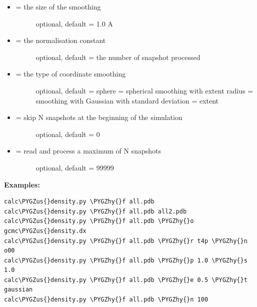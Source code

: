 \documentclass[letterpaper,10pt,english]{sphinxmanual}
\def\PYGZus{\char`\_}
\def\PYGZhy{\char`\-}
\begin{document}
\begin{itemize}
\begin{description}
\end{description}

\item {} \begin{description}
\item[{ = the size of the smoothing}] \leavevmode
optional, default =  1.0 A

\end{description}

\item {} \begin{description}
\item[{ = the normalisation constant}] \leavevmode
optional, default = the number of snapshot processed

\end{description}

\item {} \begin{description}
\item[{ = the type of coordinate smoothing}] \leavevmode
optional, default = sphere
 = spherical smoothing with extent radius
 = smoothing with Gaussian with standard deviation = extent

\end{description}

\item {} \begin{description}
\item[{ = skip N snapshots at the beginning of the simulation}] \leavevmode
optional, default = 0

\end{description}

\item {} \begin{description}
\item[{ = read and process a maximum of N snapshots}] \leavevmode
optional, default = 99999

\end{description}

\end{itemize}

\textbf{Examples:}

\begin{Verbatim}[commandchars=\\\{\}]
calc\PYGZus{}density.py \PYGZhy{}f all.pdb
calc\PYGZus{}density.py \PYGZhy{}f all.pdb all2.pdb
calc\PYGZus{}density.py \PYGZhy{}f all.pdb \PYGZhy{}o gcmc\PYGZus{}density.dx
calc\PYGZus{}density.py \PYGZhy{}f all.pdb \PYGZhy{}r t4p \PYGZhy{}n o00
calc\PYGZus{}density.py \PYGZhy{}f all.pdb \PYGZhy{}p 1.0 \PYGZhy{}s 1.0
calc\PYGZus{}density.py \PYGZhy{}f all.pdb \PYGZhy{}e 0.5 \PYGZhy{}t gaussian
calc\PYGZus{}density.py \PYGZhy{}f all.pdb \PYGZhy{}n 100
\end{Verbatim}
\end{document}
